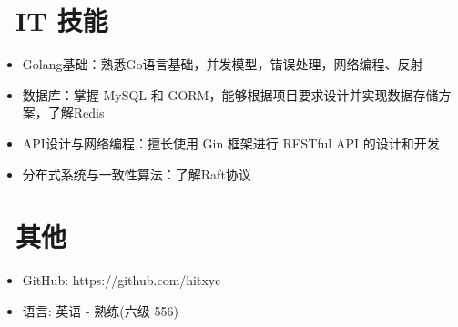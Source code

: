 \documentclass{resume}
\begin{document}

\section{\faCogs\ IT 技能}
\begin{itemize}[parsep=0.5ex]
  \item Golang基础：熟悉Go语言基础，并发模型，错误处理，网络编程、反射
  \item 数据库：掌握 MySQL 和 GORM，能够根据项目要求设计并实现数据存储方案，了解Redis
  \item API设计与网络编程：擅长使用 Gin 框架进行 RESTful API 的设计和开发
  \item 分布式系统与一致性算法：了解Raft协议
\end{itemize}

\section{\faInfo\ 其他}
\begin{itemize}[parsep=0.5ex]
  \item GitHub: https://github.com/hitxyc
  \item 语言: 英语 - 熟练(六级 556)
\end{itemize}

%
%
\end{document}
